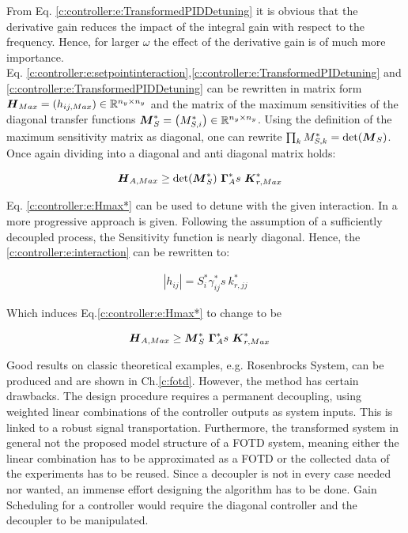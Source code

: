 From Eq. \ref{c:controller:e:TransformedPIDDetuning} it is obvious that the derivative gain reduces the impact of the integral gain with respect to the frequency. Hence, for larger $\omega$ the effect of the derivative gain is of much more importance.\\

Eq. \ref{c:controller:e:setpointinteraction},\ref{c:controller:e:TransformedPIDetuning} and \ref{c:controller:e:TransformedPIDDetuning} can be rewritten in matrix form $\mbox{\boldmath$H$}_{Max} = \left(h_{ij,Max}\right) \in \mathbb{R}^{n_y \times n_y}$ and the matrix of the maximum sensitivities of the diagonal transfer functions $\mbox{\boldmath$M$}_S^* = \left(M_{S,i}^*\right) \in \mathbb{R}^{n_y \times n_y}$. Using the definition of the maximum sensitivity matrix as diagonal, one can rewrite $\prod_k M_{S,k}^* = \det(\mbox{\boldmath$M$}_S) $. Once again dividing into a diagonal and anti diagonal matrix holds:

\begin{align}
\begin{split}
\mbox{\boldmath$H$}_{A,Max} &\geq \det(\mbox{\boldmath$M$}_S^*)~\mbox{\boldmath$\Gamma$}_A^*s~ \mbox{\boldmath$K$}_{r,Max}^* 
\end{split}
\label{c:controller:e:Hmax*}
\end{align}

Eq. \ref{c:controller:e:Hmax*} can be used to detune with the given interaction. In \cite{Astrom2006} a more progressive approach is given. Following the assumption of a sufficiently decoupled process, the Sensitivity function is nearly diagonal. Hence, the \ref{c:controller:e:interaction} can be rewritten to:

\begin{align}
\left|h_{ij} \right| = S_i^* \gamma_{ij}^*s~k_{r,jj}^*
\label{c:controller:e:ProgressiveInteraction}
\end{align}

Which induces Eq.\ref{c:controller:e:Hmax*} to change to be

\begin{align}
\begin{split}
\mbox{\boldmath$H$}_{A,Max} &\geq \mbox{\boldmath$M$}_S^*~ \mbox{\boldmath$\Gamma$}_A^*s~ \mbox{\boldmath$K$}_{r,Max}^* 
\end{split}
\label{c:controller:e:ProgressiveHmax*}
\end{align}

Good results on classic theoretical examples, e.g. Rosenbrocks System, can be produced and are shown in Ch.\ref{c:fotd}. However, the method has certain drawbacks. The design procedure requires a permanent decoupling, using weighted linear combinations of the controller outputs as system inputs. This is linked to a robust signal transportation. Furthermore, the transformed system in general not the proposed model structure of a FOTD system, meaning either the linear combination has to be approximated as a FOTD or the collected data of the experiments has to be reused. Since a decoupler is not in every case needed nor wanted, an immense effort designing the algorithm has to be done. Gain Scheduling for a controller would require the diagonal controller and the decoupler to be manipulated.\\

